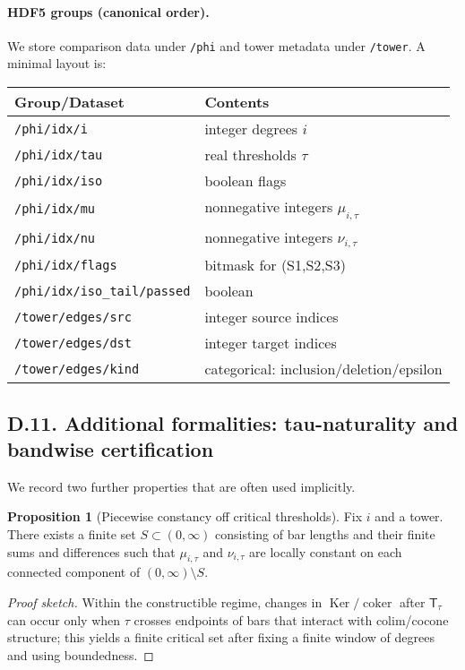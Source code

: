 \documentclass[11pt]{article}
\numberwithin{equation}{section}
\theoremstyle{plain}
\theoremstyle{definition}
\theoremstyle{remark}
\DeclareMathOperator{\Ker}{Ker}
\newcommand{\T}{\mathsf{T}}
\theoremstyle{plain}
\theoremstyle{definition}
\numberwithin{equation}{section}
\newtheorem{proposition}[theorem]{Proposition}
\theoremstyle{definition}
\numberwithin{equation}{section}
\theoremstyle{plain}
\theoremstyle{definition}
\theoremstyle{remark}
\DeclareMathOperator{\coker}{coker} %
\begin{document}
\paragraph{HDF5 groups (canonical order).}
We store comparison data under \texttt{/phi} and tower metadata under \texttt{/tower}.
A minimal layout is:

\medskip
\begin{center}
\begin{tabular}{ll}
\toprule
Group/Dataset & Contents \\
\midrule
\texttt{/phi/idx/i} & integer degrees \(i\) \\
\texttt{/phi/idx/tau} & real thresholds \(\tau\) \\
\texttt{/phi/idx/iso} & boolean flags \\
\texttt{/phi/idx/mu} & nonnegative integers \(\mu_{i,\tau}\) \\
\texttt{/phi/idx/nu} & nonnegative integers \(\nu_{i,\tau}\) \\
\texttt{/phi/idx/flags} & bitmask for (S1,S2,S3) \\
\texttt{/phi/idx/iso\_tail/passed} & boolean \\
\texttt{/tower/edges/src} & integer source indices \\
\texttt{/tower/edges/dst} & integer target indices \\
\texttt{/tower/edges/kind} & categorical: inclusion/deletion/epsilon \\
\bottomrule
\end{tabular}
\end{center}


\subsection*{D.11. Additional formalities: tau-naturality and bandwise certification}

We record two further properties that are often used implicitly.

\begin{proposition}[Piecewise constancy off critical thresholds]\label{prop:D-piecewise}
Fix \(i\) and a tower.
There exists a finite set \(S\subset(0,\infty)\) consisting of bar lengths and their finite sums and differences such that \(\mu_{i,\tau}\) and \(\nu_{i,\tau}\) are locally constant on each connected component of \((0,\infty)\setminus S\).
\end{proposition}

\begin{proof}[Proof sketch]
Within the constructible regime, changes in \(\Ker/\coker\) after \(\T_\tau\) can occur only when \(\tau\) crosses endpoints of bars that interact with colim/cocone structure; this yields a finite critical set after fixing a finite window of degrees and using boundedness.
\end{proof}
\end{document}
